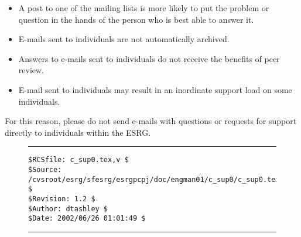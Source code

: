 \begin{itemize}
\item A post to one of the mailing lists is more likely to put the 
      problem or question in the hands of the person who is best able
      to answer it.
\item E-mails sent to individuals are not automatically archived.
\item Answers to e-mails sent to individuals do not receive the
      benefits of peer review.
\item E-mail sent to individuals may result in an inordinate
      support load on some individuals.
\end{itemize}

For this reason, please do not send e-mails with questions 
or requests for support directly
to individuals within the ESRG.





\noindent\begin{figure}[!b]
\noindent\rule[-0.25in]{\textwidth}{1pt}
\begin{tiny}
\begin{verbatim}
$RCSfile: c_sup0.tex,v $
$Source: /cvsroot/esrg/sfesrg/esrgpcpj/doc/engman01/c_sup0/c_sup0.tex,v $
$Revision: 1.2 $
$Author: dtashley $
$Date: 2002/06/26 01:01:49 $
\end{verbatim}
\end{tiny}
\noindent\rule[0.25in]{\textwidth}{1pt}
\end{figure}
%
%
